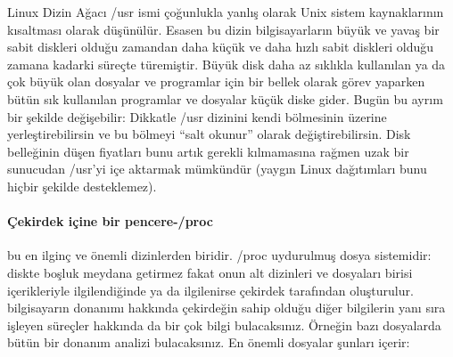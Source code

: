 \begin{section}{Linux Dizin Ağacı}
/usr ismi çoğunlukla yanlış olarak Unix sistem kaynaklarının kısaltması olarak düşünülür. Esasen bu dizin bilgisayarların büyük ve yavaş bir sabit diskleri olduğu zamandan daha küçük ve daha hızlı sabit diskleri olduğu zamana kadarki süreçte türemiştir. Büyük disk daha az sıklıkla kullanılan ya da çok büyük olan dosyalar ve programlar için bir bellek olarak görev yaparken  bütün sık kullanılan programlar ve dosyalar küçük diske gider. Bugün bu ayrım bir şekilde değişebilir: Dikkatle /usr dizinini kendi bölmesinin üzerine yerleştirebilirsin ve bu bölmeyi “salt okunur” olarak değiştirebilirsin. Disk belleğinin düşen fiyatları bunu artık gerekli kılmamasına rağmen uzak bir sunucudan /usr’yi içe aktarmak mümkündür (yaygın Linux dağıtımları bunu hiçbir şekilde desteklemez).

\paragraph{Çekirdek içine bir pencere-/proc}{bu en ilginç ve önemli dizinlerden biridir. /proc uydurulmuş dosya sistemidir: diskte boşluk meydana getirmez fakat onun alt dizinleri ve dosyaları birisi içerikleriyle ilgilendiğinde ya da ilgilenirse çekirdek tarafından oluşturulur. bilgisayarın donanımı hakkında çekirdeğin sahip olduğu diğer bilgilerin yanı sıra işleyen süreçler hakkında da bir çok bilgi bulacaksınız. Örneğin bazı dosyalarda bütün bir donanım analizi bulacaksınız. En önemli dosyalar şunları içerir:}


\end{section}
